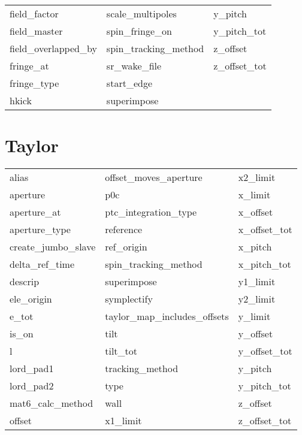 \begin{tabular}{lll}
field_factor                & scale_multipoles            & y_pitch                     \\
field_master                & spin_fringe_on              & y_pitch_tot                 \\
field_overlapped_by         & spin_tracking_method        & z_offset                    \\
fringe_at                   & sr_wake_file                & z_offset_tot                \\
fringe_type                 & start_edge                  &                             \\
hkick                       & superimpose                 &                             \\
 \bottomrule
 \end{tabular}
 \vfill
 
 \section{Taylor}
 \label{s:list.taylor}
 
 \begin{tabular}{lll} \toprule
alias                       & offset_moves_aperture       & x2_limit                    \\
aperture                    & p0c                         & x_limit                     \\
aperture_at                 & ptc_integration_type        & x_offset                    \\
aperture_type               & reference                   & x_offset_tot                \\
create_jumbo_slave          & ref_origin                  & x_pitch                     \\
delta_ref_time              & spin_tracking_method        & x_pitch_tot                 \\
descrip                     & superimpose                 & y1_limit                    \\
ele_origin                  & symplectify                 & y2_limit                    \\
e_tot                       & taylor_map_includes_offsets & y_limit                     \\
is_on                       & tilt                        & y_offset                    \\
l                           & tilt_tot                    & y_offset_tot                \\
lord_pad1                   & tracking_method             & y_pitch                     \\
lord_pad2                   & type                        & y_pitch_tot                 \\
mat6_calc_method            & wall                        & z_offset                    \\
offset                      & x1_limit                    & z_offset_tot                \\
 \bottomrule
 \end{tabular}
 \vfill
 
